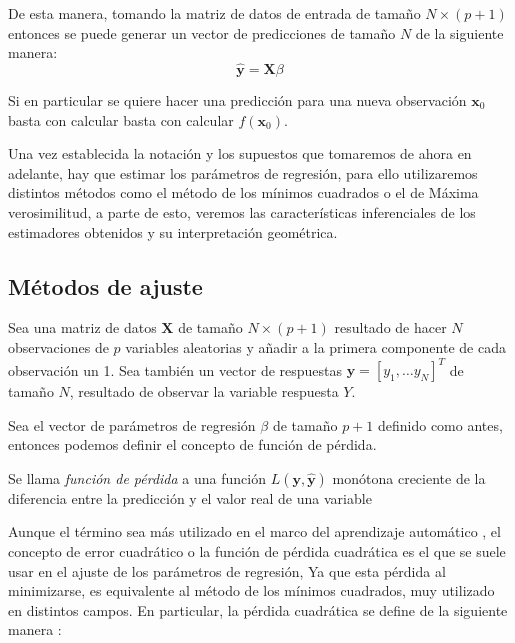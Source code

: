 \noindent De esta manera, tomando la matriz de datos de entrada de tamaño $N\times (p+1)$ entonces se puede generar un vector de predicciones de tamaño $N$ de la siguiente manera:
\begin{equation}
\mathbf{\hat{y}}=\mathbf{X}\beta 
\end{equation}  

\noindent Si en particular se quiere hacer una predicción para una nueva observación  $\mathbf{x}_0$ basta con calcular basta con calcular $f(\textbf{x}_0).$

\noindent Una vez establecida la notación y los supuestos que tomaremos de ahora en adelante, hay que estimar los parámetros de regresión, para ello utilizaremos distintos métodos como el método de los mínimos cuadrados o el de Máxima verosimilitud, a parte de esto, veremos las características inferenciales de los estimadores obtenidos y su interpretación geométrica. 

\subsection{Métodos de ajuste}

\noindent Sea una matriz de datos $\textbf{X}$ de tamaño $N\times (p+1)$ resultado de hacer $N$ observaciones de $p$ variables aleatorias y añadir a la primera componente de cada observación un 1. Sea también un vector de respuestas $\textbf{y}=[y_1,\ldots y_N]^T$ de tamaño $N$, resultado de observar la variable respuesta $Y$. 

\noindent Sea el vector de parámetros de regresión $\beta$ de tamaño $p+1$ definido como antes, entonces podemos definir el concepto de función de pérdida. 

\begin{defi}
Se llama \emph{función de pérdida} \cite{Hastie 2001} a una función $L(\textbf{y},\mathbf{\hat{y}})$ monótona creciente de la diferencia entre la predicción y el valor real de una variable
\end{defi}

\noindent Aunque el término sea más utilizado en el marco del aprendizaje automático \cite{James 2013}, el concepto de error cuadrático o la función de pérdida cuadrática es el que se suele usar en el ajuste de los parámetros de regresión, Ya que esta pérdida al minimizarse, es equivalente al método de los mínimos cuadrados, muy utilizado en distintos campos. En particular, la pérdida cuadrática se define de la siguiente manera \cite{Abdi 2007}:

